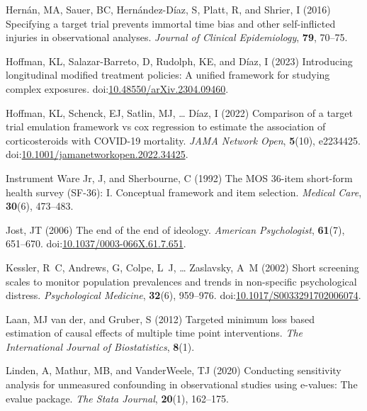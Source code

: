 \documentclass[
  single column]{article}
\newlength{\cslhangindent}
\newenvironment{CSLReferences}[2] %
 {\begin{list}{}{%
  \setlength{\itemindent}{0pt}
  \setlength{\leftmargin}{0pt}
  \setlength{\parsep}{0pt}
  \ifodd #1
   \setlength{\leftmargin}{\cslhangindent}
   \setlength{\itemindent}{-1\cslhangindent}
  \fi
  \setlength{\itemsep}{#2\baselineskip}}}
 {\end{list}}
\begin{document}
\begin{CSLReferences}{1}{0}
Hernán, MA, Sauer, BC, Hernández-Díaz, S, Platt, R, and Shrier, I (2016)
Specifying a target trial prevents immortal time bias and other
self-inflicted injuries in observational analyses. \emph{Journal of
Clinical Epidemiology}, \textbf{79}, 70--75.

Hoffman, KL, Salazar-Barreto, D, Rudolph, KE, and Díaz, I (2023)
Introducing longitudinal modified treatment policies: A unified
framework for studying complex exposures.
doi:\href{https://doi.org/10.48550/arXiv.2304.09460}{10.48550/arXiv.2304.09460}.

Hoffman, KL, Schenck, EJ, Satlin, MJ, \ldots{} Díaz, I (2022) Comparison
of a target trial emulation framework vs cox regression to estimate the
association of corticosteroids with COVID-19 mortality. \emph{JAMA
Network Open}, \textbf{5}(10), e2234425.
doi:\href{https://doi.org/10.1001/jamanetworkopen.2022.34425}{10.1001/jamanetworkopen.2022.34425}.

Instrument Ware Jr, J, and Sherbourne, C (1992) The MOS 36-item
short-form health survey (SF-36): I. Conceptual framework and item
selection. \emph{Medical Care}, \textbf{30}(6), 473--483.

Jost, JT (2006) The end of the end of ideology. \emph{American
Psychologist}, \textbf{61}(7), 651--670.
doi:\href{https://doi.org/10.1037/0003-066X.61.7.651}{10.1037/0003-066X.61.7.651}.

Kessler, R~C, Andrews, G, Colpe, L~J, \ldots{} Zaslavsky, A~M (2002)
Short screening scales to monitor population prevalences and trends in
non-specific psychological distress. \emph{Psychological Medicine},
\textbf{32}(6), 959--976.
doi:\href{https://doi.org/10.1017/S0033291702006074}{10.1017/S0033291702006074}.

Laan, MJ van der, and Gruber, S (2012) Targeted minimum loss based
estimation of causal effects of multiple time point interventions.
\emph{The International Journal of Biostatistics}, \textbf{8}(1).

Linden, A, Mathur, MB, and VanderWeele, TJ (2020) Conducting sensitivity
analysis for unmeasured confounding in observational studies using
e-values: The evalue package. \emph{The Stata Journal}, \textbf{20}(1),
162--175.


\end{CSLReferences}
\end{document}
